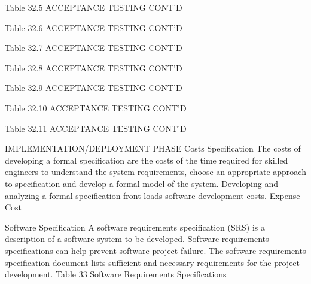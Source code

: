 Table 32.5
ACCEPTANCE TESTING CONT’D
   













Table 32.6
ACCEPTANCE TESTING CONT’D
   













Table 32.7
ACCEPTANCE TESTING CONT’D
   













Table 32.8
ACCEPTANCE TESTING CONT’D
   











Table 32.9
ACCEPTANCE TESTING CONT’D
   











Table 32.10
ACCEPTANCE TESTING CONT’D
   













Table 32.11
ACCEPTANCE TESTING CONT’D
   
IMPLEMENTATION/DEPLOYMENT PHASE
Costs Specification
The costs of developing a formal specification are the costs of the time required for skilled engineers to understand the system requirements, choose an appropriate approach to specification and develop a formal model of the system. Developing and analyzing a formal specification front-loads software development costs.
Expense	Cost
	







Software Specification
A software requirements specification (SRS) is a description of a software system to be developed. Software requirements specifications can help prevent software project failure. The software requirements specification document lists sufficient and necessary requirements for the project development.
Table 33
Software Requirements Specifications


